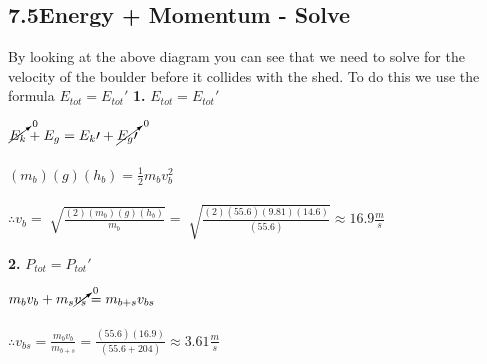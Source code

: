 \subsection*{7.5\hspace*{0.5cm}Energy + Momentum - Solve}
By looking at the above diagram you can see that we need to solve for the velocity of the boulder before it collides with the shed. To do this we use the formula $E_{tot} = E_{tot}\prime$\newline\newline
\textbf{1.} $E_{tot} = E_{tot}\prime$ \\
\begin{adjustwidth}{0.6cm}{0pt}
    $\cancelto{0}{E_{k}} + E_{g} = E_{k}\prime + \cancelto{0}{E_{g}\prime}$ \\\\
    $(m_{b})(g)(h_{b}) = \frac{1}{2}m_{b}v_{b}^2$ \\\\
    $\therefore v_{b} = \sqrt[]{\frac{(2)(m_{b})(g)(h_{b})}{m_{b}}} = \sqrt[]{\frac{(2)(55.6)(9.81)(14.6)}{(55.6)}} \approx 16.9\frac{m}{s}$
\end{adjustwidth}\vspace*{15pt}
\textbf{2.} $P_{tot} = P_{tot}\prime$ \\
\begin{adjustwidth}{0.6cm}{0pt}
    $m_{b}v_{b} + m_{s}\cancelto{0}{v_{s}} = m_{b + s}v_{bs}$ \\\\
    $\therefore v_{bs} = \frac{m_{b}v_{b}}{m_{b + s}} = \frac{(55.6)(16.9)}{(55.6 + 204)} \approx 3.61\frac{m}{s}$
\end{adjustwidth}\vspace*{15pt}
